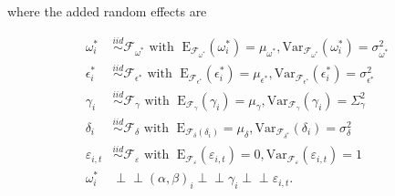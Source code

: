 \documentclass[11pt]{article}
\newcommand{\simiid}{\stackrel{iid}{\sim}} %
\newcommand{\indep}{\perp \!\!\! \perp } %
\def\mrm#1{\mathrm{#1}} %
\def\mc#1{\mathcal{#1}} %
\def\mc#1{\mathcal{#1}}
\theoremstyle{definition}
\begin{document}
 where the added random effects are

\begin{align*}
\omega^{*}_i &\simiid \mc{F}_{\omega^{*}} \text{ with }  \; \mrm{E}_{\mc{F}_{\omega^{*}}}(\omega^{*}_i) = \mu_{\omega^{*}}, \mrm{Var}_{\mc{F}_{\omega^{*}}}(\omega^{*}_i)  = \sigma^2_{\omega^{*}}  \\
\epsilon^{*}_i &\simiid \mc{F}_{\epsilon^{*}} \text{ with }  \; \mrm{E}_{\mc{F}_{\epsilon^{*}}}(\epsilon^{*}_i) = \mu_{\epsilon^{*}}, \mrm{Var}_{\mc{F}_{\epsilon^{*}}}(\epsilon^{*}_i)  = \sigma^2_{\epsilon^{*}}  \\
   \gamma_i &\simiid \mc{F}_{\gamma} \text{ with }  \; \mrm{E}_{\mc{F}_{\gamma}}(\gamma_i) = \mu_{\gamma}, \mrm{Var}_{\mc{F}_{\gamma}}(\gamma_i)  = \Sigma^2_{\gamma} \\
\delta_i &\simiid \mc{F}_{\delta} \text{ with }  \; \mrm{E}_{\mc{F}_{\delta}(\delta_i)} = \mu_{\delta}, \mrm{Var}_{\mc{F}_{\delta^{*}}}(\delta_i)  = \sigma^{2}_{\delta} \\
\varepsilon_{i,t} & \simiid  \mc{F}_{\varepsilon} \text{ with }  \; \mrm{E}_{\mc{F}_{\varepsilon}}(\varepsilon_{i,t}) = 0, \mrm{Var}_{\mc{F}_{\varepsilon}}(\varepsilon_{i,t})  = 1 \\
\omega^{*}_i &\indep  (\alpha, \beta)_i \indep \gamma_i \indep \varepsilon_{i,t}.
\end{align*}
\end{document}
